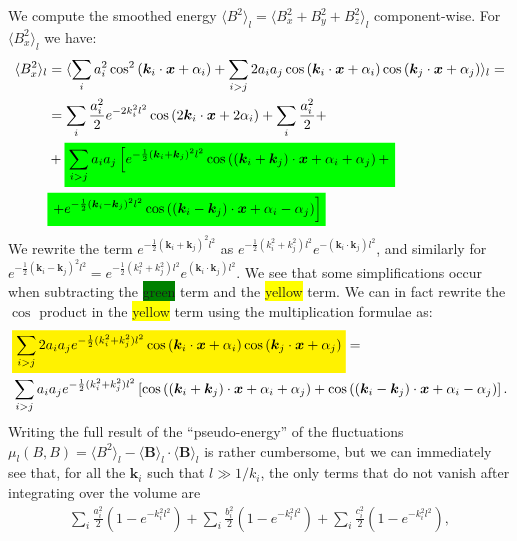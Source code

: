 \documentclass[]{article}
\newcommand{\mathcolorbox}[2]{\colorbox{#1}{$\displaystyle #2$}}
\begin{document}
%
We compute the smoothed energy $\langle B^2 \rangle_l = \langle B_x^2 + B_y^2 + B_z^2 \rangle_l$ component-wise. For $\langle B_x^2 \rangle_l$ we have:
%
\begin{align}
	\langle B_x^2 \rangle_l &= \langle \sum_i a_i^2 \cos^2 \left( \bm k_i \cdot \bm x  + \alpha_i \right) + \sum_{i>j} 2 a_i a_j \cos \left( \bm k_i \cdot \bm x  + \alpha_i \right) \cos \left( \bm k_j \cdot \bm x  + \alpha_j \right)  \rangle_l = \nonumber \\
	&= \sum_i \frac{a_i^2}{2} e^{- 2 k_i^2 l^2} \cos \left( 2 \bm k_i \cdot \bm x  + 2 \alpha_i \right) + \sum_i \frac{a_i^2}{2} + \nonumber \\
	&+ \mathcolorbox{green}{ \sum_{i>j} a_i a_j \left[e^{-\frac{1}{2} (\bm k_i + \bm k_j)^2 l^2} \cos \left( (\bm k_i + \bm k_j )\cdot \bm x  + \alpha_i + \alpha_j \right) + \right.} \nonumber \\ 
	& \mathcolorbox{green}{ \left.  + e^{-\frac{1}{2} (\bm k_i - \bm k_j)^2 l^2} \cos \left( (\bm k_i - \bm k_j )\cdot \bm x  + \alpha_i - \alpha_j \right)\right]}
\end{align}
%
We rewrite the term $e^{-\frac{1}{2} (\bm k_i + \bm k_j)^2 l^2}$ as $e^{-\frac{1}{2} (k_i^2 + k_j^2) l^2} e^{-(\bm k_i \cdot \bm k_j)l^2}$, and similarly for $e^{-\frac{1}{2} (\bm k_i - \bm k_j)^2 l^2} = e^{-\frac{1}{2} (k_i^2 + k_j^2) l^2} e^{(\bm k_i \cdot \bm k_j)l^2}$. We see that some simplifications occur when subtracting the \colorbox{green}{green} term and the \colorbox{yellow}{yellow} term. We can in fact rewrite the $\cos$ product in the \colorbox{yellow}{yellow} term using the multiplication formulae as:
%
\begin{align}
	&\mathcolorbox{yellow}{\sum_{i>j} 2 a_i a_j e^{-\frac{1}{2} (k_i^2 + k_j^2) l^2} \cos \left( \bm k_i \cdot \bm x  + \alpha_i \right) \cos \left( \bm k_j \cdot \bm x  + \alpha_j \right)} = \nonumber \\
	&\sum_{i>j} a_i a_j e^{-\frac{1}{2} (k_i^2 + k_j^2) l^2} \left[  \cos \left( (\bm k_i + \bm k_j) \cdot \bm x  + \alpha_i + \alpha_j \right) +  \cos \left( (\bm k_i - \bm k_j) \cdot \bm x  + \alpha_i - \alpha_j \right) \right].
\end{align}
%
Writing the full result of the ``pseudo-energy'' of the fluctuations $\mu_l(B,B) = \langle B^2 \rangle_l - \langle \bm B \rangle_l \cdot \langle \bm B \rangle_l$ is rather cumbersome, but we can immediately see that, for all the $\bm k_i$ such that $l \gg 1/k_i$, the only terms that do not vanish after integrating over the volume are
%
\begin{align}
	\sum_i \frac{a_i^2}{2} \left( 1 - e^{- k_i^2 l^2} \right) + \sum_i \frac{b_i^2}{2} \left( 1 - e^{- k_i^2 l^2} \right) + \sum_i \frac{c_i^2}{2} \left( 1 - e^{- k_i^2 l^2} \right),
\end{align}
\end{document}
